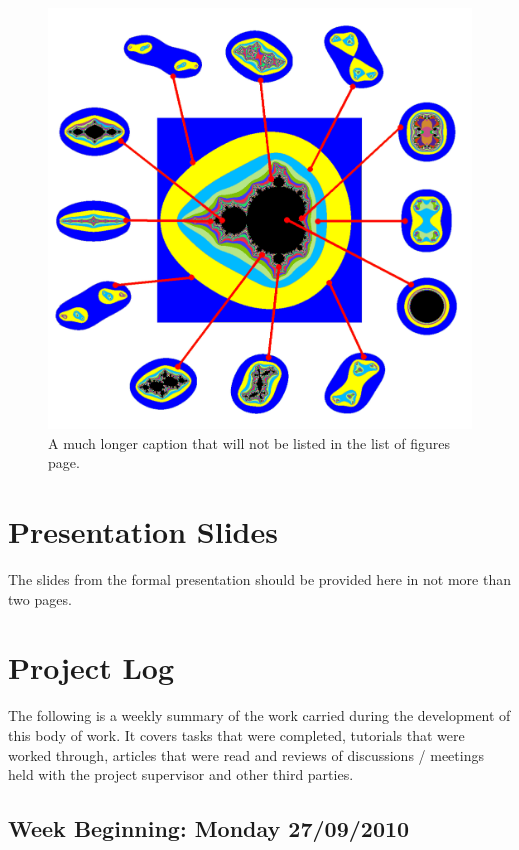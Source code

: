 \begin{figure}
\centerline{\includegraphics[width=7in]{appendix/images/samplepng}}
\caption[A Sideways Figure]{
	A much longer caption that will not be listed in the list of figures page.
}
\label{fig:sidewaysFigure}
\end{figure}

\chapter{Presentation Slides}

The slides from the formal presentation should be provided here in not more than two pages. 

\chapter{Project Log}

The following is a weekly summary of the work carried during the development of this body of work. It covers tasks that were completed, tutorials that were worked through, articles that were read and reviews of discussions / meetings held with the project supervisor and other third parties. 

\section*{Week Beginning: Monday 27/09/2010}

